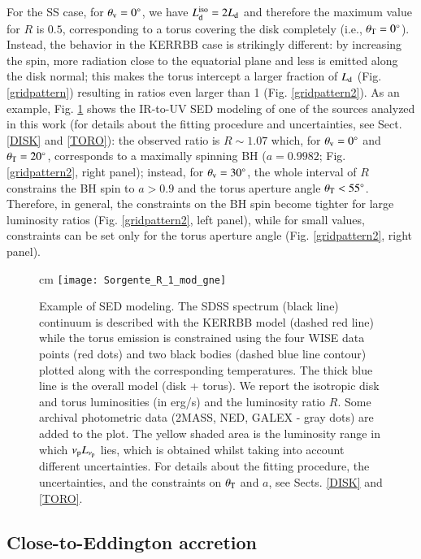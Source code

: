 \documentclass[]{aa}
\begin{document}
For the SS case, for $\theta_{\rm v} = 0^{\circ}$, we have $L^{\rm iso}_{\rm d} = 2 L_{\rm d}$ and therefore the maximum value for $R$ is $0.5$, corresponding to a torus covering the disk completely (i.e., $\theta_{\rm T} = 0^{\circ}$). Instead, the behavior in the KERRBB case is strikingly different: by increasing the spin, more radiation close to the equatorial plane and less is emitted along the disk normal; this makes the torus intercept a larger fraction of $L_{\rm d}$ (Fig. \ref{gridpattern}) resulting in ratios even larger than 1 (Fig. \ref{gridpattern2}). As an example, Fig. \ref{plot_example_1} shows the IR-to-UV SED modeling of one of the sources analyzed in this work (for details about the fitting procedure and uncertainties, see Sect. \ref{DISK} and \ref{TORO}): the observed ratio is $R \sim 1.07$ which, for $\theta_{\rm v} = 0^{\circ}$ and $\theta_{\rm T} = 20^{\circ}$, corresponds to a maximally spinning BH ($a = 0.9982$; Fig. \ref{gridpattern2}, right panel); instead, for $\theta_{\rm v} = 30^{\circ}$, the whole interval of $R$ constrains the BH spin to $a>0.9$ and the torus aperture angle $\theta_{\rm T} < 55^{\circ}$. Therefore, in general, the constraints on the BH spin become tighter for large luminosity ratios (Fig. \ref{gridpattern2}, left panel), while for small values, constraints can be set only for the torus aperture angle (Fig. \ref{gridpattern2}, right panel).

\begin{figure}
\centering
{} cm
\texttt{[image: Sorgente\_R\_1\_mod\_gne]}
\caption{Example of SED modeling. The SDSS spectrum (black line) continuum is described with the KERRBB model (dashed red line) while the torus emission is constrained using the four WISE data points (red dots) and two black bodies (dashed blue line contour) plotted along with the corresponding temperatures. The thick blue line is the overall model (disk + torus). We report the isotropic disk and torus luminosities (in erg/s) and the luminosity ratio $R$. Some archival photometric data (2MASS, NED, GALEX - gray dots) are added to the plot. The yellow shaded area is the luminosity range in which $\nu_{\rm p} L_{\nu_{\rm p}}$ lies, which is obtained whilst taking into account different uncertainties. For details about the fitting procedure, the uncertainties, and the constraints on $\theta_{\rm T}$ and $a$, see Sects. \ref{DISK} and \ref{TORO}.} 
\label{plot_example_1}
\end{figure}


\subsection{Close-to-Eddington accretion} \label{Eddedd}
\end{document}
